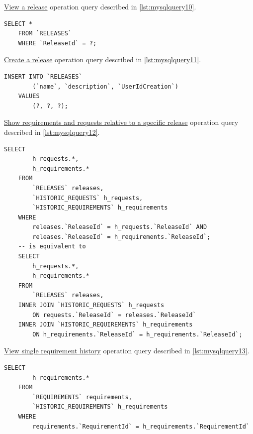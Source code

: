 \documentclass[12pt, a4paper]{report}
\begin{document}
\hyperref[subsubsec:op10]{View a release} operation query described in \autoref{lst:mysqlquery10}.

\begin{lstlisting}[language=MySQL, caption={\texorpdfstring{\hyperref[subsubsec:op10]{op. 10}}{op. 10}}, label={lst:mysqlquery10}]
    SELECT *
    FROM `RELEASES`
    WHERE `ReleaseId` = ?;
\end{lstlisting}

\hyperref[subsubsec:op11]{Create a release} operation query described in \autoref{lst:mysqlquery11}.

\begin{lstlisting}[language=MySQL, caption={\texorpdfstring{\hyperref[subsubsec:op11]{op. 11}}{op. 11}}, label={lst:mysqlquery11}]
    INSERT INTO `RELEASES`
        (`name`, `description`, `UserIdCreation`)
    VALUES
        (?, ?, ?);
\end{lstlisting}

\hyperref[subsubsec:op12]{Show requirements and requests relative to a specific release} operation query described in
\autoref{lst:mysqlquery12}.

\begin{lstlisting}[language=MySQL, caption={\texorpdfstring{\hyperref[subsubsec:op12]{op. 12}}{op. 12}}, label={lst:mysqlquery12}]
    SELECT
        h_requests.*,
        h_requirements.*
    FROM
        `RELEASES` releases,
        `HISTORIC_REQUESTS` h_requests,
        `HISTORIC_REQUIREMENTS` h_requirements
    WHERE
        releases.`ReleaseId` = h_requests.`ReleaseId` AND
        releases.`ReleaseId` = h_requirements.`ReleaseId`;
    -- is equivalent to
    SELECT
        h_requests.*,
        h_requirements.*
    FROM
        `RELEASES` releases,
    INNER JOIN `HISTORIC_REQUESTS` h_requests
        ON requests.`ReleaseId` = releases.`ReleaseId`
    INNER JOIN `HISTORIC_REQUIREMENTS` h_requirements
        ON h_requirements.`ReleaseId` = h_requirements.`ReleaseId`;
\end{lstlisting}

\hyperref[subsubsec:op13]{View single requirement history} operation query described in \autoref{lst:mysqlquery13}.

\begin{lstlisting}[language=MySQL, caption={\texorpdfstring{\hyperref[subsubsec:op13]{op. 13}}{op. 13}}, label={lst:mysqlquery13}]
    SELECT
        h_requirements.*
    FROM
        `REQUIREMENTS` requirements,
        `HISTORIC_REQUIREMENTS` h_requirements
    WHERE
        requirements.`RequirementId` = h_requirements.`RequirementId`
\end{lstlisting}
\end{document}

